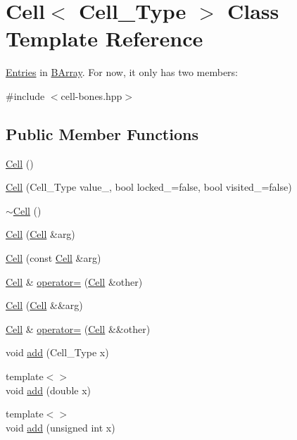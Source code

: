 \hypertarget{class_cell}{}\section{Cell$<$ Cell\+\_\+\+Type $>$ Class Template Reference}
\label{class_cell}


\hyperlink{class_entries}{Entries} in \hyperlink{class_b_array}{B\+Array}. For now, it only has two members\+:  




{\ttfamily \#include $<$cell-\/bones.\+hpp$>$}

\subsection*{Public Member Functions}
\begin{DoxyCompactItemize}
\item 
\hyperlink{class_cell_a402912c21a4c87659c0576a4bfa3c48f}{Cell} ()
\item 
\hyperlink{class_cell_aa29177047f3c4a062e3c1854efa92353}{Cell} (Cell\+\_\+\+Type value\+\_\+, bool locked\+\_\+=false, bool visited\+\_\+=false)
\item 
\hyperlink{class_cell_a12667d768c7eab9e295b3476a5d60c0e}{$\sim$\+Cell} ()
\item 
\hyperlink{class_cell_ac116d4235eadb134018324455a9bbdbf}{Cell} (\hyperlink{class_cell}{Cell} \&arg)
\item 
\hyperlink{class_cell_ab745c6f11e7f43f06318b4bb733d9474}{Cell} (const \hyperlink{class_cell}{Cell} \&arg)
\item 
\hyperlink{class_cell}{Cell} \& \hyperlink{class_cell_acf4bbf136ed394887c35cfd4e78f50b9}{operator=} (\hyperlink{class_cell}{Cell} \&other)
\item 
\hyperlink{class_cell_abe27b0c411864d9fce33a1cffe918169}{Cell} (\hyperlink{class_cell}{Cell} \&\&arg)
\item 
\hyperlink{class_cell}{Cell} \& \hyperlink{class_cell_a9bb18ace78fd9010b461c853ccc2c0f7}{operator=} (\hyperlink{class_cell}{Cell} \&\&other)
\item 
void \hyperlink{class_cell_a3d063afd2a8743623d0e524debbd55e9}{add} (Cell\+\_\+\+Type x)
\item 
{\footnotesize template$<$$>$ }\\void \hyperlink{class_cell_a64d4b92f322ccb8cfbad53f816d2caf8}{add} (double x)
\item 
{\footnotesize template$<$$>$ }\\void \hyperlink{class_cell_ae22060201cf692bbf219827453d0acd2}{add} (unsigned int x)

\end{DoxyCompactItemize}
